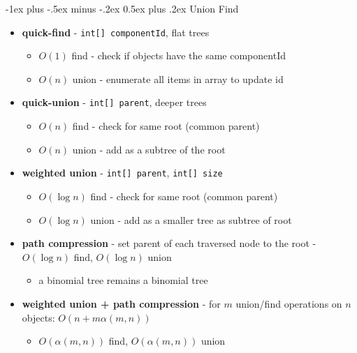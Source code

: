 \documentclass[10pt, landscape]{article}
\makeatletter
\renewcommand{\section}{\@startsection{section}{1}{0mm}%
                                {-1ex plus -.5ex minus -.2ex}%
                                {0.5ex plus .2ex}%
                                {\normalfont\large\bfseries}}
\newcommand{\code}[1]{\textcolor{myblue}{\texttt{#1}}}
\makeatother
\begin{document}
\begin{multicols}{4}
\section{Union Find}
\begin{itemize}
    \item \textbf{quick-find} - \code{int[] componentId}, flat trees
    \begin{itemize}
        \item $O(1)$ find - check if objects have the same componentId
        \item $O(n)$ union - enumerate all items in array to update id
    \end{itemize}
    \item \textbf{quick-union} - \code{int[] parent}, deeper trees
    \begin{itemize}
        \item $O(n)$ find - check for same root (common parent)
        \item $O(n)$ union - add as a subtree of the root
    \end{itemize}
    \item \textbf{weighted union} - \code{int[] parent}, \code{int[] size}
    \begin{itemize}
        \item $O(\log n)$ find - check for same root (common parent)
        \item $O(\log n)$ union - add as a smaller tree as subtree of root
    \end{itemize}
    \item \textbf{path compression} - set parent of each traversed node to the root - $O(\log n)$ find, $O(\log n)$ union
    \begin{itemize}
        \item a binomial tree remains a binomial tree
    \end{itemize}
    \item \textbf{weighted union + path compression} - for $m$ union/find operations on $n$ objects: $O(n + m\alpha (m, n))$
    \begin{itemize}
        \item $O(\alpha (m, n))$ find, $O(\alpha (m, n))$ union
    \end{itemize}
\end{itemize}


\end{multicols}
\end{document}
